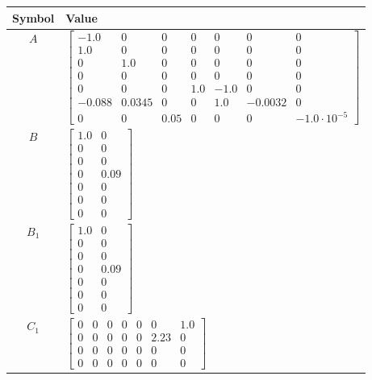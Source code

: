 \begin{tabular}{cl}
\hline
  Symbol  & Value                                                                                                                                                                                                                                                                                  \\
\hline
   $A$    & $\left[\begin{matrix}-1.0 & 0 & 0 & 0 & 0 & 0 & 0\\1.0 & 0 & 0 & 0 & 0 & 0 & 0\\0 & 1.0 & 0 & 0 & 0 & 0 & 0\\0 & 0 & 0 & 0 & 0 & 0 & 0\\0 & 0 & 0 & 1.0 & -1.0 & 0 & 0\\-0.088 & 0.0345 & 0 & 0 & 1.0 & -0.0032 & 0\\0 & 0 & 0.05 & 0 & 0 & 0 & -1.0 \cdot 10^{-5}\end{matrix}\right]$ \\
   $B$    & $\left[\begin{matrix}1.0 & 0\\0 & 0\\0 & 0\\0 & 0.09\\0 & 0\\0 & 0\\0 & 0\end{matrix}\right]$                                                                                                                                                                                          \\
 $B_{1}$  & $\left[\begin{matrix}1.0 & 0\\0 & 0\\0 & 0\\0 & 0.09\\0 & 0\\0 & 0\\0 & 0\end{matrix}\right]$                                                                                                                                                                                          \\
 $C_{1}$  & $\left[\begin{matrix}0 & 0 & 0 & 0 & 0 & 0 & 1.0\\0 & 0 & 0 & 0 & 0 & 2.23 & 0\\0 & 0 & 0 & 0 & 0 & 0 & 0\\0 & 0 & 0 & 0 & 0 & 0 & 0\end{matrix}\right]$                                                                                                                               \\

\end{tabular}
